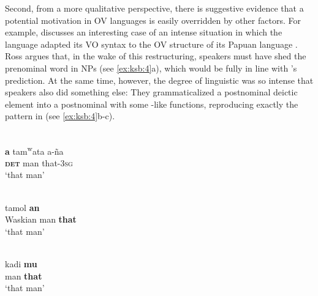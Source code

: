 \documentclass[output=paper]{langsci/langscibook}
\begin{document}
Second, from a more qualitative perspective, there is suggestive evidence that a potential  motivation in OV languages is easily overridden by other factors. For example, \citet{Ross2001_Contact} discusses an interesting case of an intense  situation in which the  language  adapted its VO syntax to the OV structure of its Papuan  language . Ross argues that, in the wake of this restructuring,  speakers must have shed the prenominal  word in NPs (see \ref{ex:ksb:4}a), which would be fully in line with ’s prediction. At the same time, however, the degree of linguistic  was so intense that  speakers also did something else: They grammaticalized a postnominal deictic element into a postnominal  with some -like functions, reproducing exactly the  pattern in  (see \ref{ex:ksb:4}b-c).

\ea\label{ex:ksb:4} 
  \ea
  \\
  \gll \textbf{a}   tam\textsuperscript{w}ata   a-ña\\
      \textbf{\textsc{det}}   man   that-3\textsc{sg}\\
  \glt ‘that man’

  \ex 
  \\
  \gll {}   tamol  \textbf{an}\\
      Waskian   man   \textbf{that}\\
  \glt ‘that  man’

  \ex
  \\
  \gll {}   kadi   \textbf{mu}\\
         man   \textbf{that}\\
  \glt ‘that  man’
  \z
\z
\end{document}
